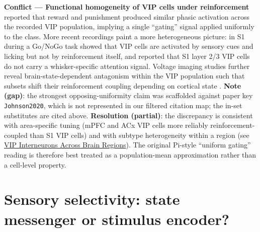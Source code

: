 \documentclass[11pt]{article}
\begin{document}
\begin{framed}
\textbf{Conflict --- Functional homogeneity of VIP cells under reinforcement}\\
\citet{Pi2013} reported that reward and punishment produced similar phasic activation across the recorded VIP population, implying a single ``gating'' signal applied uniformly to the class. More recent recordings paint a more heterogeneous picture: in S1 during a Go/NoGo task \citet{Ramamurthy2023} showed that VIP cells are activated by sensory cues and licking but not by reinforcement itself, and \citet{Ramamurthy2025} reported that S1 layer 2/3 VIP cells do not carry a whisker-specific attention signal. Voltage imaging studies further reveal brain-state-dependent antagonism within the VIP population such that subsets shift their reinforcement coupling depending on cortical state \citep{Kannan2022}. \textbf{Note (gap)}: the strongest opposing-uniformity claim was scaffolded against paper key \texttt{Johnson2020}, which is not represented in our filtered citation map; the in-set substitutes \citep{Ramamurthy2023, Ramamurthy2025, Kannan2022} are cited above. \textbf{Resolution (partial)}: the discrepancy is consistent with area-specific tuning (mPFC and ACx VIP cells more reliably reinforcement-coupled than S1 VIP cells) and with subtype heterogeneity within a region (see \href{/cross-areas}{VIP Interneurons Across Brain Regions}). The original Pi-style ``uniform gating'' reading is therefore best treated as a population-mean approximation rather than a cell-level property.
\end{framed}

\section{Sensory selectivity: state messenger or stimulus encoder?}
\end{document}
